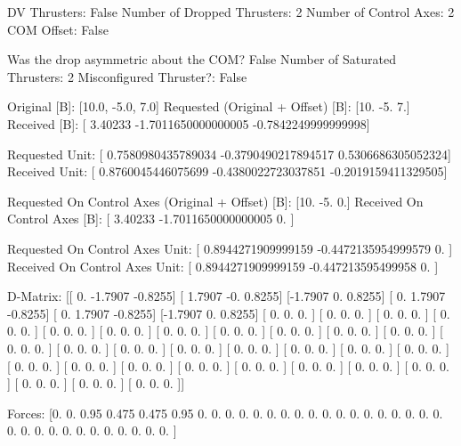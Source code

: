 DV Thrusters:	False
Number of Dropped Thrusters:	2
Number of Control Axes:	2
COM Offset:	False

Was the drop asymmetric about the COM?	False
Number of Saturated Thrusters:	2
Misconfigured Thruster?:	False

Original [B]:	[10.0, -5.0, 7.0]
Requested (Original + Offset) [B]:	[10. -5.  7.]
Received [B]:		[ 3.40233            -1.7011650000000005 -0.7842249999999998]

Requested Unit:		[ 0.7580980435789034 -0.3790490217894517  0.5306686305052324]
Received Unit:		[ 0.8760045446075699 -0.4380022723037851 -0.2019159411329505]

Requested On Control Axes (Original + Offset) [B]:	[10. -5.  0.]
Received On Control Axes [B]:		[ 3.40233            -1.7011650000000005  0.                ]

Requested On Control Axes Unit:		[ 0.8944271909999159 -0.4472135954999579  0.                ]
Received On Control Axes Unit:		[ 0.8944271909999159 -0.447213595499958   0.                ]

D-Matrix:
[[ 0.     -1.7907 -0.8255]
 [ 1.7907 -0.      0.8255]
 [-1.7907  0.      0.8255]
 [ 0.      1.7907 -0.8255]
 [ 0.      1.7907 -0.8255]
 [-1.7907  0.      0.8255]
 [ 0.      0.      0.    ]
 [ 0.      0.      0.    ]
 [ 0.      0.      0.    ]
 [ 0.      0.      0.    ]
 [ 0.      0.      0.    ]
 [ 0.      0.      0.    ]
 [ 0.      0.      0.    ]
 [ 0.      0.      0.    ]
 [ 0.      0.      0.    ]
 [ 0.      0.      0.    ]
 [ 0.      0.      0.    ]
 [ 0.      0.      0.    ]
 [ 0.      0.      0.    ]
 [ 0.      0.      0.    ]
 [ 0.      0.      0.    ]
 [ 0.      0.      0.    ]
 [ 0.      0.      0.    ]
 [ 0.      0.      0.    ]
 [ 0.      0.      0.    ]
 [ 0.      0.      0.    ]
 [ 0.      0.      0.    ]
 [ 0.      0.      0.    ]
 [ 0.      0.      0.    ]
 [ 0.      0.      0.    ]
 [ 0.      0.      0.    ]
 [ 0.      0.      0.    ]
 [ 0.      0.      0.    ]
 [ 0.      0.      0.    ]
 [ 0.      0.      0.    ]
 [ 0.      0.      0.    ]]

Forces:
[0.    0.    0.95  0.475 0.475 0.95  0.    0.    0.    0.    0.    0.
 0.    0.    0.    0.    0.    0.    0.    0.    0.    0.    0.    0.
 0.    0.    0.    0.    0.    0.    0.    0.    0.    0.    0.    0.   ]

